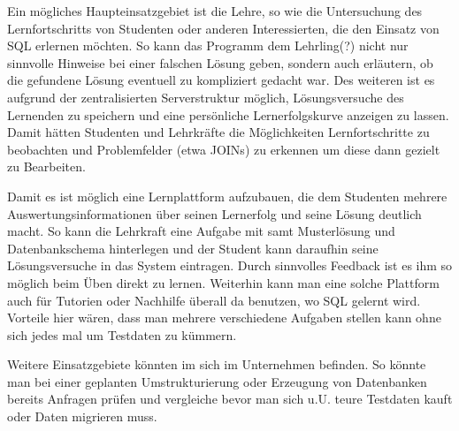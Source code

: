Ein mögliches Haupteinsatzgebiet ist die Lehre, so wie die Untersuchung des Lernfortschritts von Studenten oder anderen Interessierten, die den Einsatz von SQL erlernen möchten. So kann das Programm dem Lehrling(?) nicht nur sinnvolle Hinweise bei einer falschen Lösung geben, sondern auch erläutern, ob die gefundene Lösung eventuell zu kompliziert gedacht war. Des weiteren ist es aufgrund der zentralisierten Serverstruktur möglich, Lösungsversuche des Lernenden zu speichern und eine persönliche Lernerfolgskurve anzeigen zu lassen. Damit hätten Studenten und Lehrkräfte die Möglichkeiten Lernfortschritte zu beobachten und Problemfelder (etwa JOINs) zu erkennen um diese dann gezielt zu Bearbeiten.

Damit es ist möglich eine Lernplattform aufzubauen, die dem Studenten mehrere Auswertungsinformationen über seinen Lernerfolg und seine Lösung deutlich macht. So kann die Lehrkraft eine Aufgabe mit samt Musterlösung und Datenbankschema hinterlegen und der Student kann daraufhin seine Lösungsversuche in das System eintragen. Durch sinnvolles Feedback ist es ihm so möglich beim Üben direkt zu lernen. Weiterhin kann man eine solche Plattform auch für Tutorien oder Nachhilfe überall da benutzen, wo SQL gelernt wird. Vorteile hier wären, dass man mehrere verschiedene Aufgaben stellen kann ohne sich jedes mal um Testdaten zu kümmern.

Weitere Einsatzgebiete könnten im sich im Unternehmen befinden. So könnte man bei einer geplanten Umstrukturierung oder Erzeugung von Datenbanken bereits Anfragen prüfen und vergleiche bevor man sich u.U. teure Testdaten kauft oder Daten migrieren muss.
